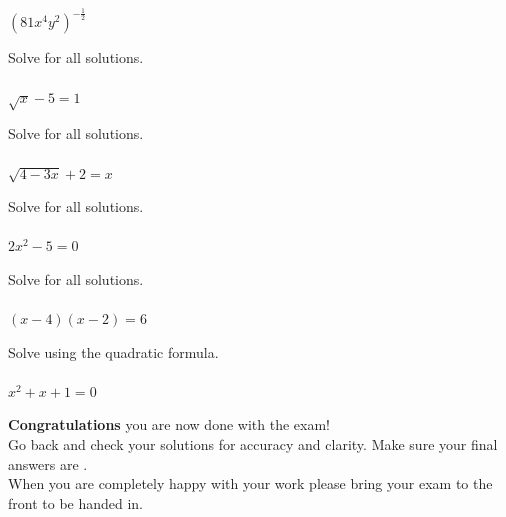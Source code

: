 \documentclass[addpoints,12pt,answers]{exam}
\begin{document}
\begin{questions}
\question[5]\label{oper-end} $(81x^4y^2)^{-\frac{1}{2}}$
\answerline

\newpage

\question[5] Solve for all solutions. \\ \\ $\sqrt{x}-5=1$
\answerline

\newpage

\question[5] Solve for all solutions. \\ \\ $\sqrt{4-3x}+2=x$
\answerline

\newpage

\question[5] Solve for all solutions. \\ \\ $2x^2-5=0$
\answerline

\newpage

\question[5] Solve for all solutions. \\ \\ $(x-4)(x-2)=6$
\answerline

\newpage

\question[5] Solve using the quadratic formula.\\ \\ $x^2+x+1=0$
\answerline

\end{questions}

\newpage

\begin{tcolorbox}[colback=gray!15,colframe=black]
{\Large \textbf{Congratulations} you are now done with the exam!}\\

{Go back and check your solutions for accuracy and clarity.  Make sure your final answers are . }\\

{When you are completely happy with your work please bring your exam to the front to be handed in. }
\end{tcolorbox}


\vspace{1.5cm}

\vfill
\end{document}
